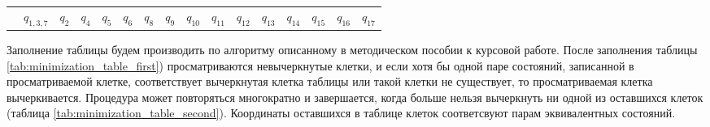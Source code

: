 \documentclass[a4paper,14pt,russian]{extarticle} %
\begin{document}
\begin{sidewaystable}
\begin{tabular}{l c c c c c c c c c c c c c c c }
		\cline{2-16}
		& \({q_{1,3,7}}\)& \({q_{2}}\)& \({q_{4}}\)& \({q_{5}}\)& \({q_{6}}\)& \({q_{8}}\)& \({q_{9}}\)& \({q_{10}}\)& \({q_{11}}\)& \({q_{12}}\)& \({q_{13}}\)& \({q_{14}}\)& \({q_{15}}\)& \({q_{16}}\)& \({q_{17}}\)
	\end{tabular}
\end{sidewaystable}	

Заполнение таблицы будем производить по алгоритму описанному в методическом пособии к курсовой работе. После заполнения таблицы \ref{tab:minimization_table_first}) просматриваются невычеркнутые клетки, и если хотя бы одной паре состояний, записанной в просматриваемой клетке, соответствует вычеркнутая клетка таблицы или такой клетки не существует, то просматриваемая клетка вычеркивается. Процедура может повторяться многократно и завершается, когда больше нельзя вычеркнуть ни одной из оставшихся клеток (таблица \ref{tab:minimization_table_second}). Координаты оставшихся в таблице клеток соответсвуют парам эквивалентных состояний.
\end{document}
